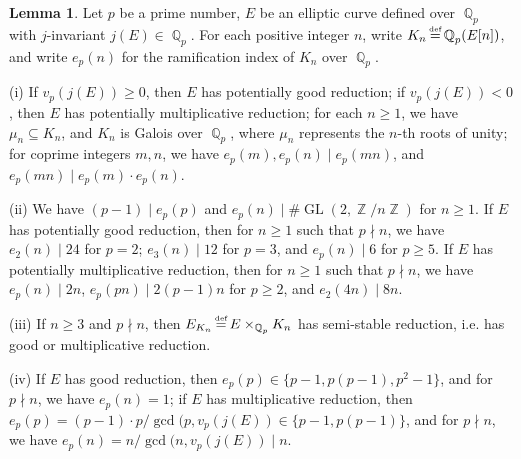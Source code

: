 \documentclass[a4paper, 12pt]{article}
\DeclareMathOperator{\defeq}{\overset{\text{\tiny{def}}}{=}}
\DeclareMathOperator{\Z}{\mathbb{Z}}
\DeclareMathOperator{\Q}{\mathbb{Q}}
\DeclareMathOperator{\GL}{\text{GL}}
\numberwithin{equation}{section}
\theoremstyle{definition}
\newtheorem{lem}[thm]{Lemma}
\begin{document}
\begin{lem} \label{1-2-lem: basic properties}
Let $p$ be a prime number, $E$ be an elliptic curve defined over $\Q_p$ with $j$-invariant $j(E) \in \Q_p$.
For each positive integer $n$, write $K_n \defeq \Q_p(E[n])$, and write $e_p(n)$ for the ramification index of $K_n$ over $\Q_p$.

(i) If $v_p(j(E)) \ge 0$, then $E$ has potentially good reduction;
if $v_p(j(E)) < 0$, then $E$ has potentially multiplicative reduction;
for each $n\ge 1$, we have $\mu_n \subseteq K_n$, and $K_n$ is Galois over $\Q_p$,
where $\mu_n$ represents the $n$-th roots of unity;
for coprime integers $m,n$, we have $e_p(m), e_p(n) \mid e_p(mn)$, and $e_p(mn) \mid  e_p(m) \cdot e_p(n)$.

(ii) We have $(p-1) \mid e_p(p)$ and $e_p(n) \mid \#\GL(2,\Z/n\Z)$ for $n\ge 1$.
If $E$ has potentially good reduction, then for $n\ge 1$ such that $p\nmid n$, we have $e_2(n) \mid 24$ for $p = 2$; $e_3(n) \mid 12$ for $p = 3$, and $e_p(n) \mid 6$ for $p\ge 5$.
If $E$ has potentially multiplicative reduction, then for $n\ge 1$ such that $p\nmid n$,  we have $e_p(n) \mid 2n$, $e_p(pn) \mid 2(p-1)n$ for $p\ge 2$, and $e_2(4n) \mid 8n$.

(iii) If $n \ge 3$ and $p\nmid n$, then $E_{K_n} \defeq E\times_{\Q_p} K_n$ has semi-stable reduction, i.e. has good or multiplicative reduction.

(iv) If $E$ has good reduction, then $e_p(p) \in \{p-1, p(p-1), p^2-1\}$, and for $p\nmid n$, we have $e_p(n) = 1$; 
if $E$ has multiplicative reduction, then $e_p(p) = (p-1)\cdot p / \gcd(p,v_p(j(E)) \in \{p-1, p(p-1)\}$, and for $p\nmid n$, we have $e_p(n) = n / \gcd(n,v_p(j(E)) \mid n$.
\end{lem}
\end{document}
